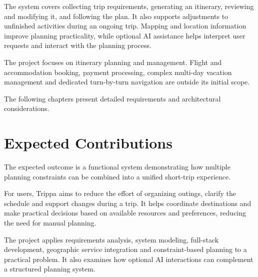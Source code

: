 The system covers collecting trip requirements, generating an itinerary, reviewing and modifying it, and following the plan. It also supports adjustments to unfinished activities during an ongoing trip. Mapping and location information improve planning practicality, while optional AI assistance helps interpret user requests and interact with the planning process.


The project focuses on itinerary planning and management. Flight and accommodation booking, payment processing, complex multi-day vacation management and dedicated turn-by-turn navigation are outside its initial scope.


The following chapters present detailed requirements and architectural considerations.


\section{Expected Contributions}

The expected outcome is a functional system demonstrating how multiple planning constraints can be combined into a unified short-trip experience.


For users, Trippa aims to reduce the effort of organizing outings, clarify the schedule and support changes during a trip. It helps coordinate destinations and make practical decisions based on available resources and preferences, reducing the need for manual planning.


The project applies requirements analysis, system modeling, full-stack development, geographic service integration and constraint-based planning to a practical problem. It also examines how optional AI interactions can complement a structured planning system.